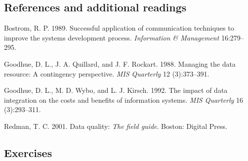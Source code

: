 \documentclass[
]{article}
\begin{document}
\hypertarget{references-and-additional-readings-8}{%
\subsection*{References and additional readings}\label{references-and-additional-readings-8}}

Bostrom, R. P. 1989. Successful application of communication techniques
to improve the systems development process. \emph{Information \& Management}
16:279--295.

Goodhue, D. L., J. A. Quillard, and J. F. Rockart. 1988. Managing the
data resource: A contingency perspective. \emph{MIS Quarterly} 12
(3):373--391.

Goodhue, D. L., M. D. Wybo, and L. J. Kirsch. 1992. The impact of data
integration on the costs and benefits of information systems. \emph{MIS
Quarterly} 16 (3):293--311.

Redman, T. C. 2001. Data quality: \emph{The field guide}. Boston: Digital
Press.

\hypertarget{exercises-15}{%
\subsection*{Exercises}\label{exercises-15}}
\end{document}
